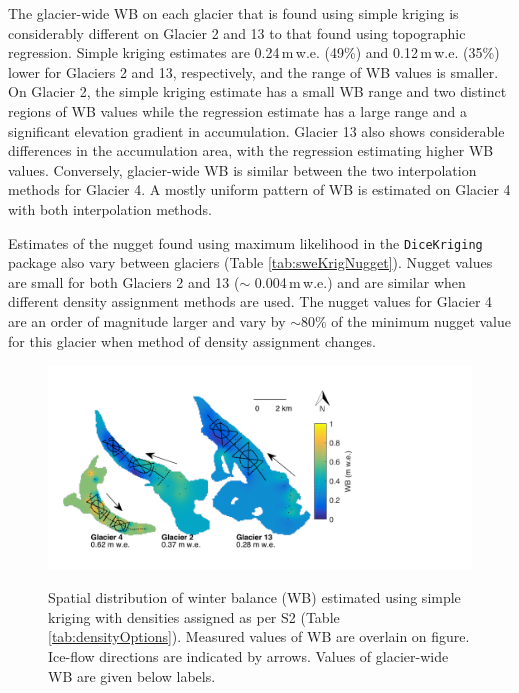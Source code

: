 \documentclass{sfuthesis}
\begin{document}
The glacier-wide WB on each glacier that is found using simple kriging is considerably different on Glacier 2 and 13 to that found using topographic regression. Simple kriging estimates are 0.24\,m\,w.e. (49\%) and 0.12\,m\,w.e. (35\%) lower for Glaciers 2 and 13, respectively, and the range of WB values is smaller. On Glacier 2, the simple kriging estimate has a small WB range and two distinct regions of WB values while the regression estimate has a large range and a significant elevation gradient in accumulation. Glacier 13 also shows considerable differences in the accumulation area, with the regression estimating higher WB values. Conversely, glacier-wide WB is similar between the two interpolation methods for Glacier 4. A mostly uniform pattern of WB is estimated on Glacier 4 with both interpolation methods.

Estimates of the nugget found using maximum likelihood in the \texttt{DiceKriging} package also vary between glaciers (Table \ref{tab:sweKrigNugget}). Nugget values are small for both Glaciers 2 and 13 ($\sim$ 0.004\,m\,w.e.) and are similar when different density assignment methods are used. The nugget values for Glacier 4 are an order of magnitude larger and vary by $\sim$80\% of the minimum nugget value for this glacier when method of density assignment changes. 

\begin{figure}[H]
	\centering
	\includegraphics[width =0.9 \textwidth]{SK_map.pdf}\\
	\caption[Spatial distribution of winter balance (WB) estimated using simple kriging with densities assigned as per S2]{Spatial distribution of winter balance (WB) estimated using simple kriging with densities assigned as per S2 (Table \ref{tab:densityOptions}). Measured values of WB are overlain on figure. Ice-flow directions are indicated by arrows. Values of glacier-wide WB are given below labels.}
	\label{fig:sweKRIGING}
\end{figure}
\end{document}
